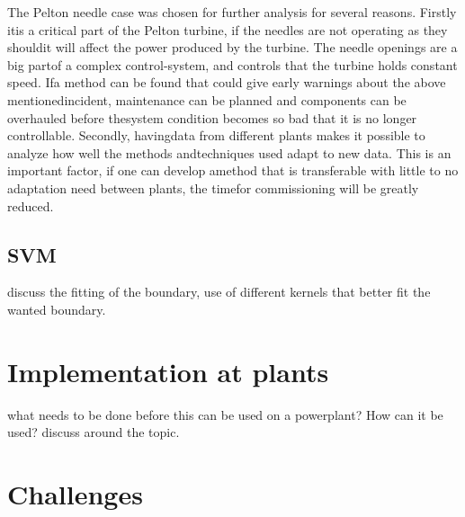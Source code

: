     
    The Pelton needle case was chosen for further analysis for several reasons. Firstly itis a critical part of the Pelton turbine, if the needles are not operating as they shouldit will affect the power produced by the turbine. The needle openings are a big partof a complex control-system, and controls that the turbine holds constant speed. Ifa method can be found that could give early warnings about the above mentionedincident, maintenance can be planned and components can be overhauled before thesystem condition becomes so bad that it is no longer controllable. Secondly, havingdata from different plants makes it possible to analyze how well the methods andtechniques used adapt to new data. This is an important factor, if one can develop amethod that is transferable with little to no adaptation need between plants, the timefor commissioning will be greatly reduced.
    
    \subsection{SVM}
        discuss the fitting of the boundary, use of different kernels that better fit the wanted boundary. 
    
\section{Implementation at plants}
    what needs to be done before this can be used on a powerplant? How can it be used? discuss around the topic. 
    
    
\section{Challenges}
    

    
